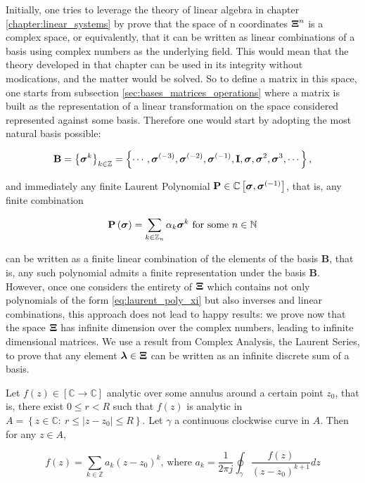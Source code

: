 	Initially, one tries to leverage the theory of linear algebra in chapter \ref{chapter:linear_systems} by prove that the space of n coordinates $\boldsymbol{\Xi}^n$ is a complex space, or equivalently, that it can be written as linear combinations of a basis using complex numbers as the underlying field. This would mean that the theory developed in that chapter can be used in its integrity without modications, and the matter would be solved. So to define a matrix in this space, one starts from subsection \ref{sec:bases_matrices_operations} where a matrix is built as the representation of a linear transformation on the space considered represented against some basis. Therefore one would start by adopting the most natural basis possible:

\begin{equation} \mathbf{B} = \left\{\boldsymbol{\sigma}^{k}\right\}_{k\in\mathbb{Z}} = \left\{\cdots,\boldsymbol{\sigma}^{(-3)},\boldsymbol{\sigma}^{(-2)},\boldsymbol{\sigma}^{(-1)},\mathbf{I},\boldsymbol{\sigma},\boldsymbol{\sigma}^{2},\boldsymbol{\sigma}^{3},\cdots\right\},\end{equation}

	\noindent and immediately any finite Laurent Polynomial $\mathbf{P}\in\mathbb{C}\left[\boldsymbol{\sigma},\boldsymbol{\sigma}^{(-1)}\right]$, that is, any finite combination

\begin{equation} \mathbf{P}\left(\boldsymbol{\sigma}\right) = \sum_{k\in\mathbb{Z}_n} \alpha_k\boldsymbol{\sigma}^{k} \text{ for some } n\in\mathbb{N} \label{eq:laurent_poly_xi}\end{equation}

	\noindent can be written as a finite linear combination of the elements of the basis $\mathbf{B}$, that is, any such polynomial admits a finite representation under the basis $\mathbf{B}$. However, once one considers the entirety of $\boldsymbol{\Xi}$ which contains not only polynomials of the form \eqref{eq:laurent_poly_xi} but also inverses and linear combinations, this approach does not lead to happy results: we prove now that the space $\boldsymbol{\Xi}$ has infinite dimension over the complex numbers, leading to infinite dimensional matrices. We use a result from Complex Analysis, the Laurent Series, to prove that any element $\boldsymbol{\lambda}\in\boldsymbol{\Xi}$ can be written as an infinite discrete sum of a basis.

\begin{theorem}\label{theo:laurent} %

	Let $f(z)\in\left[\mathbb{C}\to\mathbb{C}\right]$ analytic over some annulus around a certain point $z_0$, that is, there exist $0 \leq r < R$ such that $f(z)$ is analytic in $A = \left\{z\in\mathbb{C}:\ r \leq \left\lvert z - z_0\right\rvert \leq R\right\}$. Let $\gamma$ a continuous clockwise curve in $A$. Then for any $z\in A$,

\begin{equation} f(z) = \sum_{k\in\mathbb{Z}} a_k\left(z - z_0\right)^k \text{, where } a_k = \dfrac{1}{2\pi j} \oint_\gamma \dfrac{f(z)}{\left(z - z_0\right)^{k+1}} dz \end{equation}

\end{theorem} %


